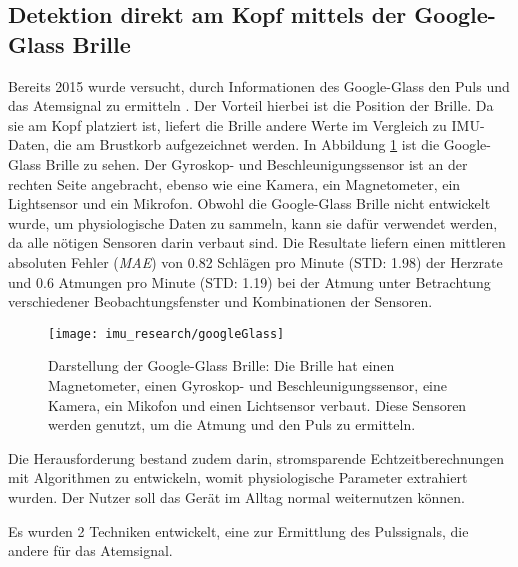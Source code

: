 \subsection{Detektion direkt am Kopf mittels der Google-Glass Brille}
Bereits 2015 wurde versucht, durch Informationen des Google-Glass den Puls und das Atemsignal zu ermitteln \cite{hernandezCardiacRespiratoryParameter}. 
Der Vorteil hierbei ist die Position der Brille. 
Da sie am Kopf platziert ist, liefert die Brille andere Werte im Vergleich zu IMU-Daten, die am Brustkorb aufgezeichnet werden.
In Abbildung \ref{imu_research_google_glass} ist die Google-Glass Brille zu sehen.
Der Gyroskop- und Beschleunigungssensor ist an der rechten Seite angebracht, ebenso wie eine Kamera, ein Magnetometer, ein Lightsensor und ein Mikrofon. 
Obwohl die Google-Glass Brille nicht entwickelt wurde, um physiologische Daten zu sammeln, kann sie dafür verwendet werden, da alle nötigen Sensoren darin verbaut sind.
Die Resultate liefern einen mittleren absoluten Fehler (\textit{MAE}) von 0.82 Schlägen pro Minute (STD: 1.98) der Herzrate und 0.6 Atmungen pro Minute (STD: 1.19) bei der Atmung unter Betrachtung verschiedener Beobachtungsfenster und Kombinationen der Sensoren. 

\begin{figure}[ht]
    \centering
    \texttt{[image: imu\_research/googleGlass]}
    \caption{Darstellung der Google-Glass Brille: Die Brille hat einen Magnetometer, einen Gyroskop- und Beschleunigungssensor, eine Kamera, ein Mikofon und einen Lichtsensor verbaut. Diese Sensoren werden genutzt, um die Atmung und den Puls zu ermitteln. \cite{hernandezCardiacRespiratoryParameter}}
    \label{imu_research_google_glass}
\end{figure}
Die Herausforderung bestand zudem darin, stromsparende Echtzeitberechnungen mit Algorithmen zu entwickeln, womit physiologische Parameter extrahiert wurden. Der Nutzer soll das Gerät im Alltag normal weiternutzen können. 

Es wurden 2 Techniken entwickelt, eine zur Ermittlung des Pulssignals, die andere für das Atemsignal.
